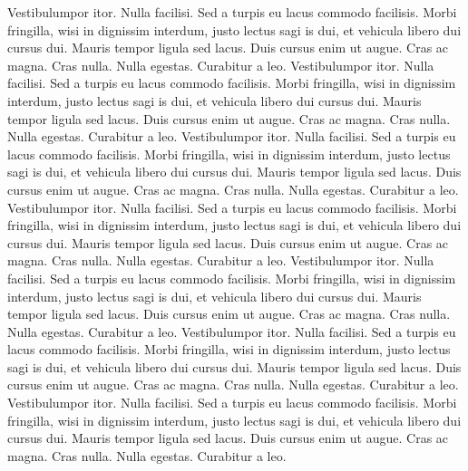 \documentclass[letterpaper,12pt,oneside]{utexas-dissertation}
\begin{document}
Vestibulumpor itor. Nulla facilisi. Sed a turpis eu lacus commodo facilisis. Morbi fringilla, wisi in dignissim interdum, justo lectus sagi is dui, et vehicula libero dui cursus dui. Mauris tempor ligula sed lacus. Duis cursus enim ut augue. Cras ac magna. Cras nulla. Nulla egestas. Curabitur a leo.  
Vestibulumpor itor. Nulla facilisi. Sed a turpis eu lacus commodo facilisis. Morbi fringilla, wisi in dignissim interdum, justo lectus sagi is dui, et vehicula libero dui cursus dui. Mauris tempor ligula sed lacus. Duis cursus enim ut augue. Cras ac magna. Cras nulla. Nulla egestas. Curabitur a leo.  
Vestibulumpor itor. Nulla facilisi. Sed a turpis eu lacus commodo facilisis. Morbi fringilla, wisi in dignissim interdum, justo lectus sagi is dui, et vehicula libero dui cursus dui. Mauris tempor ligula sed lacus. Duis cursus enim ut augue. Cras ac magna. Cras nulla. Nulla egestas. Curabitur a leo.  
Vestibulumpor itor. Nulla facilisi. Sed a turpis eu lacus commodo facilisis. Morbi fringilla, wisi in dignissim interdum, justo lectus sagi is dui, et vehicula libero dui cursus dui. Mauris tempor ligula sed lacus. Duis cursus enim ut augue. Cras ac magna. Cras nulla. Nulla egestas. Curabitur a leo.  
Vestibulumpor itor. Nulla facilisi. Sed a turpis eu lacus commodo facilisis. Morbi fringilla, wisi in dignissim interdum, justo lectus sagi is dui, et vehicula libero dui cursus dui. Mauris tempor ligula sed lacus. Duis cursus enim ut augue. Cras ac magna. Cras nulla. Nulla egestas. Curabitur a leo. 
Vestibulumpor itor. Nulla facilisi. Sed a turpis eu lacus commodo facilisis. Morbi fringilla, wisi in dignissim interdum, justo lectus sagi is dui, et vehicula libero dui cursus dui. Mauris tempor ligula sed lacus. Duis cursus enim ut augue. Cras ac magna. Cras nulla. Nulla egestas. Curabitur a leo.  
Vestibulumpor itor. Nulla facilisi. Sed a turpis eu lacus commodo facilisis. Morbi fringilla, wisi in dignissim interdum, justo lectus sagi is dui, et vehicula libero dui cursus dui. Mauris tempor ligula sed lacus. Duis cursus enim ut augue. Cras ac magna. Cras nulla. Nulla egestas. Curabitur a leo.   

\backmatter
\end{document}
